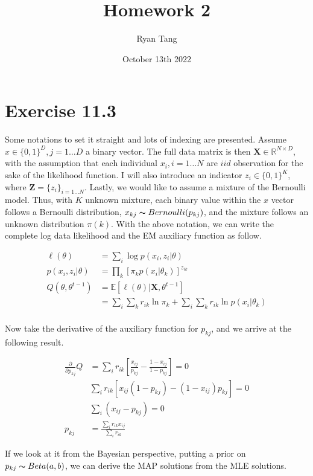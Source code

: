 \documentclass[11pt, letterpaper]{article}
\title{Homework 2}
\author{Ryan Tang}
\date{October 13th 2022}
\begin{document}
\maketitle

\section{Exercise 11.3}
Some notations to set it straight and lots of indexing are presented. Assume $x \in \{0,1\}^D, j = 1 \dots D$ a binary vector. The full data matrix is then $\mathbf{X} \in \mathbb{R}^{N \times D}$, with the assumption that each individual $x_i, i = 1 \dots N$ are $iid$ observation for the sake of the likelihood function. I will also introduce an indicator $z_i \in \{0, 1\}^K$, where $\mathbf{Z} = \{z_i\}_{i=1\dots N}$. Lastly, we would like to assume a mixture of the Bernoulli model. Thus, with $K$ unknown mixture, each binary value within the $x$ vector follows a Bernoulli distribution, $x_{kj} \thicksim Bernoulli(p_{kj})$, and the mixture follows an unknown distribution $\pi(k)$. With the above notation, we can write the complete log data likelihood and the EM auxiliary function as follow.

\begin{align*}
    \ell(\theta) &= \sum_i \log p(x_i, z_i|\theta) \\
    p(x_i, z_i|\theta) &= \prod_k [\pi_k p(x_i|\theta_k)]^{z_{ik}} \\
    Q(\theta, \theta^{t-1}) &= \mathbb{E}[\ell(\theta)|\mathbf{X}, \theta^{t-1}] \\
        &= \sum_i \sum_k r_{ik} \ln \pi_k + \sum_i \sum_k r_{ik} \ln p(x_i|\theta_k) \\ 
\end{align*}

Now take the derivative of the auxiliary function for $p_{kj}$, and we arrive at the following result.

\begin{align*}
    \frac{\partial}{\partial p_{kj}}Q &= \sum_i r_{ik} [\frac{x_{ij}}{p_{kj}} - \frac{1-x_{ij}}{1-p_{kj}}] = 0 \\
        & \sum_i r_{ik} [x_{ij}(1-p_{kj}) - (1-x_{ij})p_{kj}] = 0 \\
        & \sum_i (x_{ij} - p_{kj}) = 0 \\
    p_{kj} &= \frac{\sum_i r_{ik} x_{ij}}{\sum_i r_{ik}}
\end{align*}

If we look at it from the Bayesian perspective, putting a prior on $p_{kj} \thicksim Beta(a, b)$, we can derive the MAP solutions from the MLE solutions.
\end{document}

